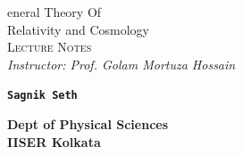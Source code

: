 \documentclass[usenames, svgnames, dvipsnames]{scrartcl}
\begin{document}
\makeatletter
\begin{titlepage}
    \vspace*{2cm}
    
        \begin{center}
            {\rmfamily
                \Huge{\textcolor{blue!30!black}{%
                    \textmd{{}}eneral {\HUGE T}heory {\HUGE O}f\\
                     {\HUGE R}elativity and {\HUGE C}osmology%
                }}\\[0.7cm]
                
                
                \Large \textsc{Lecture Notes} \\[0.3cm]
               \Large \textit{Instructor: Prof. Golam Mortuza Hossain }\\[1.5cm]

            }
            \end{center}
       
        \begin{figure}[H]
            \centering
            
        \end{figure}
        \vspace{1cm}
        \begin{center}
           \Large \texttt{\textbf{{\LARGE  S}agnik {\LARGE S}eth }}
        \end{center}
        \vspace{0.5cm}
      \begin{center}
    \textbf{ Dept of Physical Sciences} \\
    \textbf{IISER Kolkata}
    \vspace{0.5cm}

   
\end{center}

\end{titlepage}
\end{document}
